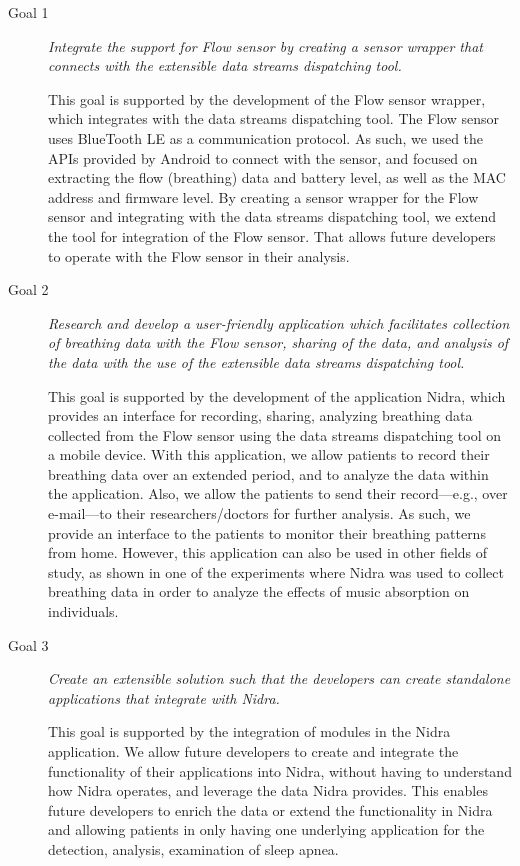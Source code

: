 \begin{description}
    \item[Goal 1] \textit{Integrate the support for Flow sensor by creating a sensor wrapper that connects with the extensible data streams dispatching tool.}

    This goal is supported by the development of the Flow sensor wrapper, which integrates with the data streams dispatching tool. The Flow sensor uses BlueTooth LE as a communication protocol. As such, we used the APIs provided by Android to connect with the sensor, and focused on extracting the flow (breathing) data and battery level, as well as the MAC address and firmware level. By creating a sensor wrapper for the Flow sensor and integrating with the data streams dispatching tool, we extend the tool for integration of the Flow sensor. That allows future developers to operate with the Flow sensor in their analysis.\\

    \item[Goal 2] \textit{Research and develop a user-friendly application which facilitates collection of breathing data with the Flow sensor, sharing of the data, and analysis of the data with the use of the extensible data streams dispatching tool.}

    This goal is supported by the development of the application Nidra, which provides an interface for recording, sharing, analyzing breathing data collected from the Flow sensor using the data streams dispatching tool on a mobile device. With this application, we allow patients to record their breathing data over an extended period, and to analyze the data within the application. Also, we allow the patients to send their record---e.g., over e-mail---to their researchers/doctors for further analysis. As such, we provide an interface to the patients to monitor their breathing patterns from home. However, this application can also be used in other fields of study, as shown in one of the experiments where Nidra was used to collect breathing data in order to analyze the effects of music absorption on individuals.
    
    \item[Goal 3] \textit{Create an extensible solution such that the developers can create standalone applications that integrate with Nidra.}

    This goal is supported by the integration of modules in the Nidra application. We allow future developers to create and integrate the functionality of their applications into Nidra, without having to understand how Nidra operates, and leverage the data Nidra provides. This enables future developers to enrich the data or extend the functionality in Nidra and allowing patients in only having one underlying application for the detection, analysis, examination of sleep apnea.
\end{description}


